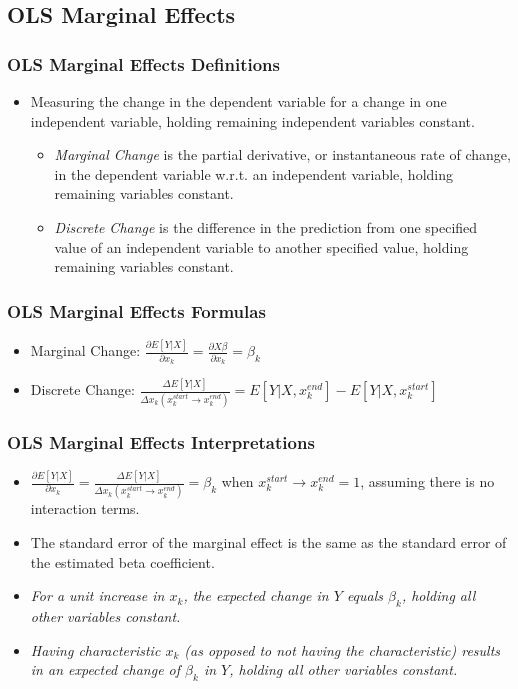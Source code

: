 \documentclass{beamer}
\begin{document}
\subsection{OLS Marginal Effects}

\begin{frame}
	\frametitle{OLS Marginal Effects Definitions}
		\begin{itemize}
			\item Measuring the change in the dependent variable for a change in one independent variable, holding remaining independent variables constant.
				\begin{itemize}
					\item \textit{Marginal Change} is the partial derivative, or instantaneous rate of change, in the dependent variable w.r.t. an independent variable, holding remaining variables constant.
					\item \textit{Discrete Change} is the difference in the prediction from one specified value of an independent variable to another specified value, holding remaining variables constant.
				\end{itemize}
		\end{itemize}
\end{frame}

\begin{frame}
	\frametitle{OLS Marginal Effects Formulas}
		\begin{itemize}
			\item Marginal Change: $\frac{\partial E[Y|X]}{\partial x_{k}}=\frac{\partial X\beta}{\partial x_{k}}=\beta_{k}$
			\item Discrete Change: $\frac{\Delta E[Y|X]}{\Delta x_{k}\left(x^{start}_{k}\rightarrow x^{end}_{k}\right)}=E[Y|X, x^{end}_{k}]-E[Y|X, x^{start}_{k}]$
		\end{itemize}
\end{frame}

\begin{frame}
	\frametitle{OLS Marginal Effects Interpretations}
		\begin{itemize}
			\item $\frac{\partial E[Y|X]}{\partial x_{k}}=\frac{\Delta E[Y|X]}{\Delta x_{k}\left(x^{start}_{k}\rightarrow x^{end}_{k}\right)}=\beta_{k}$ when $x^{start}_{k}\rightarrow x^{end}_{k}=1$, assuming there is no interaction terms.
			\item The standard error of the marginal effect is the same as the standard error of the estimated beta coefficient.
			\item \textit{For a unit increase in $x_{k}$, the expected change in $Y$ equals $\beta_{k}$, holding all other variables constant.}
			\item \textit{Having characteristic $x_{k}$ (as opposed to not having the characteristic) results in an expected change of $\beta_{k}$ in $Y$, holding all other variables constant.}
		\end{itemize}
\end{frame}
\end{document}
